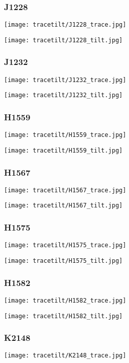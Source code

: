 \subsubsection{J1228}
\texttt{[image: tracetilt/J1228\_trace.jpg]}

\texttt{[image: tracetilt/J1228\_tilt.jpg]}

\subsubsection{J1232}
\texttt{[image: tracetilt/J1232\_trace.jpg]}

\texttt{[image: tracetilt/J1232\_tilt.jpg]}

\subsubsection{H1559}
\texttt{[image: tracetilt/H1559\_trace.jpg]}

\texttt{[image: tracetilt/H1559\_tilt.jpg]}

\subsubsection{H1567}
\texttt{[image: tracetilt/H1567\_trace.jpg]}

\texttt{[image: tracetilt/H1567\_tilt.jpg]}

\subsubsection{H1575}
\texttt{[image: tracetilt/H1575\_trace.jpg]}

\texttt{[image: tracetilt/H1575\_tilt.jpg]}

\subsubsection{H1582}
\texttt{[image: tracetilt/H1582\_trace.jpg]}

\texttt{[image: tracetilt/H1582\_tilt.jpg]}

\subsubsection{K2148}
\texttt{[image: tracetilt/K2148\_trace.jpg]}

